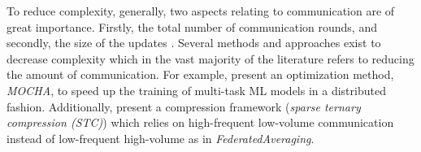 To reduce complexity, generally, two aspects relating to communication are of great importance. Firstly, the total number of communication rounds, and secondly, the size of the updates \citep{li2020federated}. Several methods and approaches exist to decrease complexity which in the vast majority of the literature refers to reducing the amount of communication. For example, \citet{smith2017federated} present an optimization method, \emph{MOCHA}, to speed up the training of multi-task ML models in a distributed fashion. Additionally, \citet{sattler2019robust} present a compression framework (\emph{sparse ternary compression (STC)}) which relies on high-frequent low-volume communication instead of low-frequent high-volume as in \emph{FederatedAveraging}.
